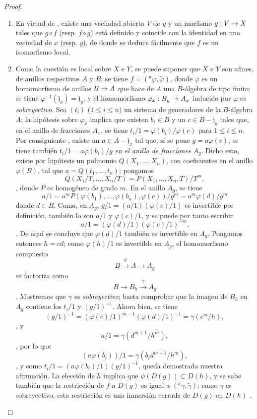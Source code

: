 \documentclass[oneside]{amsart}
\theoremstyle{ega-env-style}
\theoremstyle{ega-thm-env-style}
\theoremstyle{ega-defn-env-style}
\def\leq{\leqslant}                 %
\def\setmin{-}                      %
\renewcommand{\to}{\mathchoice{\longrightarrow}{\rightarrow}{\rightarrow}{\rightarrow}}
\newcommand{\oldpage}[2][]{{\marginnote{\normalfont{\textbf{#1}~|~#2}}}\ignorespaces}
\begin{document}
\begin{proof}
\medskip\noindent
\begin{enumerate}
  \item[(ii)] En virtud de , existe una vecindad abierta $V$ de $y$ y un morfismo $g:V\to X$ tales que $g\circ f$ (resp. $f\circ g$) está definido y coincide con la identidad en una vecindad de $x$ (resp. $y$), de donde se deduce fácilmente que $f$ es un isomorfismo local.
  \item[(i)] Como la cuestión es local sobre $X$ e $Y$, se puede suponer que $X$ e $Y$ son afines, de anillos respectivos $A$ y $B$;
    se tiene $f=({}^a\varphi,\widetilde{\varphi})$, donde $\varphi$ es un homomorfismo de anillos $B\to A$ que hace de $A$ una $B$-álgebra de tipo finito;
    se tiene $\varphi^{-1}(\mathfrak{j}_x)=\mathfrak{j}_y$, y el homomorfismo $\varphi_x:B_y\to A_x$ inducido por $\varphi$ es \emph{sobreyectivo}.
    Sea $(t_i)$ ($1\leq i\leq n$) un sistema de generadores de la $B$-álgebra $A$;
    la hipótesis sobre $\varphi_x$ implica que existen $b_i\in B$ y un $c\in B\setmin\mathfrak{j}_y$ tales que, en el anillo de fracciones $A_x$, se tiene $t_i/1=\varphi(b_i)/\varphi(c)$ para $1\leq i\leq n$.
    Por consiguiente , existe un $a\in A\setmin\mathfrak{j}_x$ tal que, si se pone $g=a\varphi(c)$, se tiene también $t_i/1=a\varphi(b_i)/g$ \emph{en el anillo de fracciones $A_g$}.
    Dicho esto, existe por hipótesis un polinomio $Q(X_1,\ldots,X_n)$, con coeficientes en el anillo $\varphi(B)$,
\oldpage[I]{152}
    tal que $a=Q(t_1,\ldots,t_n)$;
    pongamos \[
      Q(X_1/T,\ldots,X_n/T)
      =P(X_1,\ldots,X_n,T)/T^m,
    \], donde $P$ es homogéneo de grado $m$.
    En el anillo $A_g$, se tiene
    \[
      a/1
      =a^mP(\varphi(b_1),\ldots,\varphi(b_n),\varphi(c))/g^m
      =a^m\varphi(d)/g^m
    \]
    donde $d\in B$.
    Como, en $A_g$, $g/1=(a/1)(\varphi(c)/1)$ es invertible por definición, también lo son $a/1$ y $\varphi(c)/1$, y se puede por tanto escribir \[
      a/1=(\varphi(d)/1)(\varphi(c)/1)^{-m}.
    \].
    De aquí se concluye que $\varphi(d)/1$ también es invertible en $A_g$.
    Pongamos entonces $h=cd$;
    como $\varphi(h)/1$ es invertible en $A_g$, el homomorfismo compuesto \[
      B\xrightarrow{\varphi}A\longrightarrow A_g
    \] se factoriza como \[
      B\longrightarrow B_h\xrightarrow{\gamma}A_g
    \] .
    Mostremos que $\gamma$ es \emph{sobreyectivo};
    basta comprobar que la imagen de $B_h$ en $A_g$ contiene los $t_i/1$ y $(g/1)^{-1}$.
    Ahora bien, se tiene \[
      (g/1)^{-1}
      =(\varphi(c)/1)^{m-1}(\varphi(d)/1)^{-1}
      =\gamma(c^m/h),
    \], y \[
      a/1=\gamma(d^{m+1}/h^m),
    \], por lo que \[
      (a\varphi(b_i))/1=\gamma(b_i d^{m+1}/h^m),
    \], y como $t_i/1=(a\varphi(b_i)/1)(g/1)^{-1}$, queda demostrada nuestra afirmación.
    La elección de $h$ implica que $\psi(D(g))\subset D(h)$, y se sabe también que la restricción de $f$ a $D(g)$ es igual a $({}^a\gamma,\widetilde{\gamma})$;
    como $\gamma$ es sobreyectivo, esta restricción es una inmersión cerrada de $D(g)$ en $D(h)$ .
\end{enumerate}
\end{proof}
\end{document}
